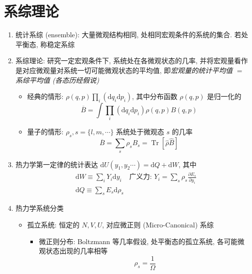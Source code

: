 \documentclass[12pt,a4paper]{article}%
\numberwithin{equation}{section}
\newcommand{\dif}{\mathrm{d}}
\begin{document}
\section{系综理论} %
\label{sec:ensemble_theory}
\begin{enumerate}
    \item 统计系综 (ensemble): 大量微观结构相同, 
    处相同宏观条件的系统的集合. 若处平衡态, 称稳定系综
    \item 系综理论: 研究一定宏观条件下, 
    系统处在各微观状态的几率, 
    并将宏观量看作是对应微观量对系统一切可能微观状态的平均值, 
    即\emph{宏观量的统计平均值 $=$ 系综平均值 (各态历经假说)}
    \begin{itemize}
        \item 经典的情形: $\rho(q,p)\prod_i(\dif q_i\dif p_i)$, 
        其中分布函数 $\rho(q,p)$ 是归一化的
        \begin{equation}
            \overline B = \int\prod_i(\dif q_i\dif p_i)\rho(q,p)B(q,p)
        \end{equation}
        \item 量子的情形: $\rho_s, s = \{l,m,\cdots\}$ 
        系统处于微观态 $s$ 的几率
        \begin{equation}
            \overline B = \sum_s\rho_s B_s 
            = \operatorname{Tr}[\hat\rho\hat B]
        \end{equation}
    \end{itemize}
    \item 热力学第一定律的统计表达 $\dif U(y_1,y_2\cdots) = \dif Q + \dif W$, 其中
    \begin{align}
        &\dif W \equiv \sum_{i} Y_i\dif y_i 
        &\mbox{广义力: } Y_i = \sum_s\rho_s \frac{\partial E_s}{\partial y_i} \\
        &\dif Q \equiv \sum_s E_s\dif \rho_s
    \end{align}
    \item 热力学系统分类
    \begin{itemize}
        \item 孤立系统: 恒定的 $N, V, U$, 对应微正则 (Micro-Canonical) 系综
        \begin{itemize}
            \item 微正则分布: Boltzmann 等几率假设, 处平衡态的孤立系统, 各可能微观状态出现的几率相等
            \begin{equation}
                \rho_s = \frac 1\Omega
            \end{equation}
        \end{itemize}

\end{itemize}
\end{enumerate}
\end{document}
